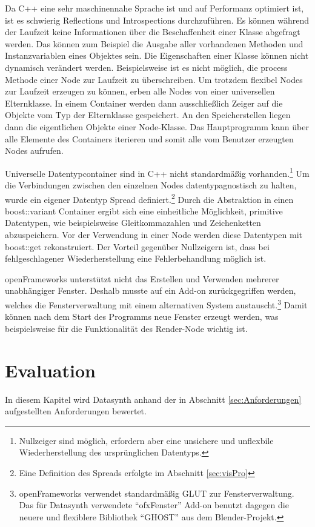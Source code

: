 \documentclass[a4paper, 
               12pt,
               DIV=calc,
               version=first,
               pdftex,
               headsepline,
               footsepline,
               bibtotocnumbered,
               liststotocnumbered]{scrreprt}
\begin{document}
Da C++ eine sehr maschinennahe Sprache ist und auf Performanz optimiert ist,
ist es schwierig Reflections und Introspections durchzuführen.
Es können während der Laufzeit keine Informationen
über die Beschaffenheit einer Klasse abgefragt werden.
Das können zum Beispiel die Ausgabe aller vorhandenen Methoden und Instanzvariablen eines Objektes sein.
Die Eigenschaften einer Klasse können nicht dynamisch verändert werden. Beispielsweise
ist es nicht möglich, die process Methode einer Node zur Laufzeit zu überschreiben.
Um trotzdem flexibel Nodes zur Laufzeit erzeugen zu können, erben alle Nodes
von einer universellen Elternklasse. In einem Container werden dann ausschließlich Zeiger
auf die Objekte vom Typ der Elternklasse gespeichert. An den Speicherstellen
liegen dann die eigentlichen Objekte einer Node-Klasse. Das Hauptprogramm kann
über alle Elemente des Containers iterieren und somit alle vom Benutzer erzeugten
Nodes aufrufen.

Universelle Datentypcontainer sind in C++ nicht standardmäßig vorhanden.\footnote{Nullzeiger sind
möglich, erfordern aber eine unsichere und unflexbile Wiederherstellung des ursprünglichen Datentyps.} Um die Verbindungen
zwischen den einzelnen Nodes datentypagnostisch zu halten, wurde ein
eigener Datentyp Spread definiert.\footnote{Eine Definition des Spreads erfolgte im Abschnitt \ref{sec:visPro}}
Durch die Abstraktion in einen boost::variant Container ergibt sich eine einheitliche Möglichkeit, primitive Datentypen,
wie beispielsweise Gleitkommazahlen und Zeichenketten abzuspeichern. Vor der Verwendung in einer Node werden diese
Datentypen mit boost::get rekonstruiert. Der Vorteil gegenüber Nullzeigern ist, dass bei fehlgeschlagener
Wiederherstellung eine Fehlerbehandlung möglich ist.

openFrameworks unterstützt nicht das Erstellen und Verwenden mehrerer
unabhängiger Fenster. Deshalb musste
auf ein Add-on zurückgegriffen werden, welches die Fensterverwaltung
mit einem alternativen System austauscht.\footnote{openFrameworks verwendet standardmäßig GLUT
zur Fensterverwaltung. Das für Datasynth verwendete "`ofxFenster"' Add-on benutzt dagegen die neuere und
flexiblere Bibliothek "`GHOST"' aus dem Blender-Projekt.} Damit können nach dem Start des Programms
neue Fenster erzeugt werden, was beispielsweise für die Funktionalität des Render-Node wichtig ist.

\chapter{Evaluation}
\label{cha:Auswertung}
In diesem Kapitel wird Datasynth anhand der in Abschnitt \ref{sec:Anforderungen}
aufgestellten Anforderungen bewertet.
\end{document}
